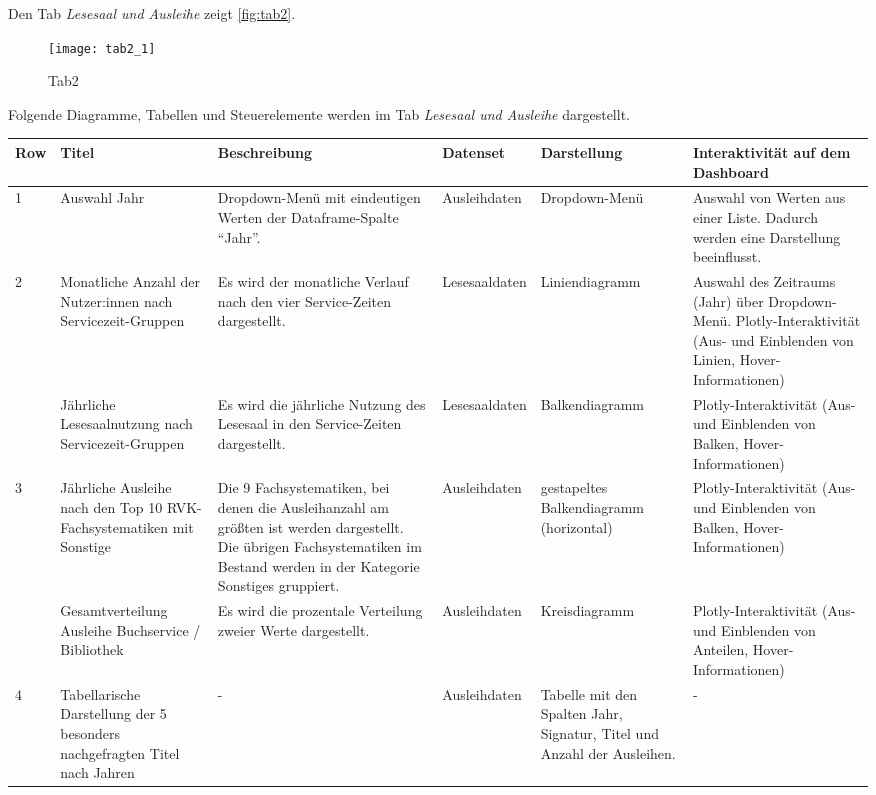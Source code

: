 Den Tab \textit{Lesesaal und Ausleihe} zeigt \autoref{fig:tab2}.

    \begin{figure}[H]
        \centering
            \texttt{[image: tab2\_1]}
            \caption{Tab2}
            \label{fig:tab2}
    \end{figure}
    
\clearpage
Folgende Diagramme, Tabellen und Steuerelemente werden im Tab \textit{Lesesaal und Ausleihe} dargestellt.


    \begingroup
    \setlength{\tabcolsep}{12pt} %
    \begin{table}[h]
        \LARGE
        \centering
        \begin{adjustbox}{max width=\textwidth}
        \begin{tabular}{p{}p{}p{}p{}p{}p{}}
           \toprule
           Row        &Titel &Beschreibung &Datenset &Darstellung &Interaktivität auf dem Dashboard\\
           \midrule
            1           &Auswahl  Jahr &Dropdown-Menü mit eindeutigen Werten der Dataframe-Spalte \enquote{Jahr}.&Ausleihdaten&Dropdown-Menü &Auswahl von Werten aus einer Liste. Dadurch werden eine Darstellung beeinflusst.\\
           \midrule
            2           &Monatliche Anzahl der Nutzer:innen nach Servicezeit-Gruppen&Es wird der monatliche Verlauf nach den vier Service-Zeiten dargestellt.&Lesesaaldaten&Liniendiagramm&Auswahl des Zeitraums (Jahr) über Dropdown-Menü. Plotly-Interaktivität (Aus- und Einblenden von Linien, Hover-Informationen)\\
                        &Jährliche Lesesaalnutzung nach Servicezeit-Gruppen&Es wird die jährliche Nutzung des Lesesaal in den Service-Zeiten dargestellt.&Lesesaaldaten&Balkendiagramm    &Plotly-Interaktivität (Aus- und Einblenden von Balken, Hover-Informationen)\\          
            \midrule
            3           &Jährliche Ausleihe nach den Top 10 RVK-Fachsystematiken mit Sonstige&Die 9 Fachsystematiken, bei denen die Ausleihanzahl am größten ist werden dargestellt. Die übrigen Fachsystematiken im Bestand werden in der Kategorie Sonstiges gruppiert.&Ausleihdaten&gestapeltes Balkendiagramm (horizontal)&Plotly-Interaktivität (Aus- und Einblenden von Balken, Hover-Informationen)\\
                        &Gesamtverteilung Ausleihe Buchservice / Bibliothek&Es wird die prozentale Verteilung zweier Werte dargestellt.&Ausleihdaten    &Kreisdiagramm   &Plotly-Interaktivität (Aus- und Einblenden von Anteilen, Hover-Informationen)\\
            \midrule
            4           &Tabellarische Darstellung der 5 besonders nachgefragten Titel nach Jahren&-&Ausleihdaten    &Tabelle mit den Spalten Jahr, Signatur, Titel und Anzahl der Ausleihen.&-\\


\end{tabular}
\end{adjustbox}
\end{table}
